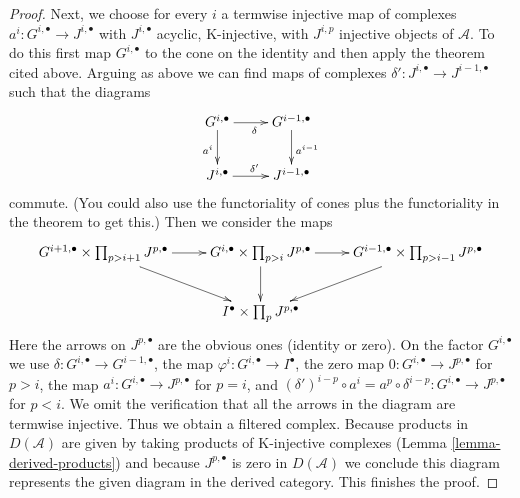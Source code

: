 \documentclass[10pt,a4paper]{amsart}
\theoremstyle{plain}
\theoremstyle{definition}
\theoremstyle{remark}
\numberwithin{equation}{subsection}
\begin{document}
\begin{proof}
\medskip\noindent
Next, we choose for every $i$ a termwise injective map of complexes
$a^i : G^{i, \bullet} \to J^{i, \bullet}$ with $J^{i, \bullet}$
acyclic, K-injective, with $J^{i, p}$ injective objects of $\mathcal{A}$.
To do this first map $G^{i, \bullet}$ to the cone on the identity
and then apply the theorem cited above.
Arguing as above we can find maps of complexes
$\delta' : J^{i, \bullet} \to J^{i - 1, \bullet}$ such that the diagrams
$$
\xymatrix{
G^{i, \bullet} \ar[r]_\delta \ar[d]_{a^i} &
G^{i - 1, \bullet} \ar[d]^{a^{i - 1}} \\
J^{i, \bullet} \ar[r]^{\delta'} &
J^{i - 1, \bullet}
}
$$
commute. (You could also use the functoriality of cones plus the
functoriality in the theorem to get this.)
Then we consider the maps
$$
\xymatrix{
G^{i + 1, \bullet} \times \prod\nolimits_{p > i + 1} J^{p, \bullet}
\ar[r] \ar[rd] &
G^{i, \bullet} \times \prod\nolimits_{p > i} J^{p, \bullet}
\ar[r] \ar[d] &
G^{i - 1, \bullet} \times \prod\nolimits_{p > i - 1} J^{p, \bullet}
\ar[ld] \\
& I^\bullet \times \prod\nolimits_p J^{p, \bullet}
}
$$
Here the arrows on $J^{p, \bullet}$ are the obvious ones
(identity or zero). On the factor $G^{i, \bullet}$ we use
$\delta : G^{i, \bullet} \to G^{i - 1, \bullet}$, the map
$\varphi^i : G^{i, \bullet} \to I^\bullet$, the zero map
$0 : G^{i, \bullet} \to J^{p, \bullet}$ for $p > i$, the map
$a^i : G^{i, \bullet} \to J^{p, \bullet}$ for $p = i$, and
$(\delta')^{i - p} \circ a^i = a^p \circ \delta^{i - p} :
G^{i, \bullet} \to J^{p, \bullet}$ for $p < i$.
We omit the verification that all the arrows
in the diagram are termwise injective. Thus we obtain a filtered
complex. Because products in $D(\mathcal{A})$ are given by
taking products of K-injective complexes
(Lemma \ref{lemma-derived-products})
and because $J^{p, \bullet}$ is zero in $D(\mathcal{A})$
we conclude this diagram represents the given diagram in the derived
category. This finishes the proof.
\end{proof}
\end{document}
